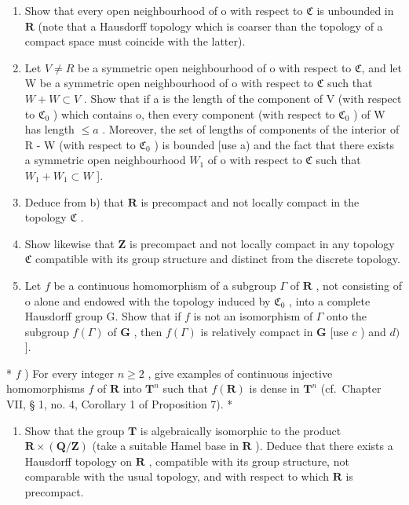 \begin{enumerate}
\def\labelenumi{\alph{enumi})}
\item
  Show that every open neighbourhood of o with respect to \(\mathfrak{C}\) is unbounded in \(\mathbf{R}\) (note that a Hausdorff topology which is coarser than the topology of a compact space must coincide with the latter).
\item
  Let \(V \neq R\) be a symmetric open neighbourhood of o with respect to \(\mathfrak{C}\), and let W be a symmetric open neighbourhood of o with respect to \(\mathfrak{C}\) such that \(W + W \subset V\) . Show that if a is the length of the component of V (with respect to \(\mathfrak{C}_{0}\) ) which contains o, then every component (with respect to \(\mathfrak{C}_{0}\) ) of W has length \(\leqslant a\) . Moreover, the set of lengths of components of the interior of R - W (with respect to \(\mathfrak{C}_{0}\) ) is bounded {[}use a) and the fact that there exists a symmetric open neighbourhood \(W_{1}\) of o with respect to \(\mathfrak{C}\) such that \(W_{1} + W_{1} \subset W\) {]}.
\item
  Deduce from b) that \(\mathbf{R}\) is precompact and not locally compact in the topology \(\mathfrak{C}\) .
\item
  Show likewise that \(\mathbf{Z}\) is precompact and not locally compact in any topology \(\mathfrak{C}\) compatible with its group structure and distinct from the discrete topology.
\item
  Let \(f\) be a continuous homomorphism of a subgroup \(\Gamma\) of \(\mathbf{R}\) , not consisting of o alone and endowed with the topology induced by \(\mathfrak{C}_0\) , into a complete Hausdorff group G. Show that if \(f\) is not an isomorphism of \(\Gamma\) onto the subgroup \(f(\Gamma)\) of \(\mathbf{G}\) , then \(f(\Gamma)\) is relatively compact in \(\mathbf{G}\) {[}use \(c\) ) and \(d)\) {]}.
\end{enumerate}

* \(f\) ) For every integer \(n \geqslant 2\) , give examples of continuous injective homomorphisms \(f\) of \(\mathbf{R}\) into \(\mathbf{T}^n\) such that \(f(\mathbf{R})\) is dense in \(\mathbf{T}^n\) (cf.~Chapter VII, § 1, no. 4, Corollary 1 of Proposition 7). *

\begin{enumerate}
\def\labelenumi{\arabic{enumi})}
\setcounter{enumi}{2}
\tightlist
\item
  Show that the group \(\mathbf{T}\) is algebraically isomorphic to the product \(\mathbf{R} \times (\mathbf{Q}/\mathbf{Z})\) (take a suitable Hamel base in \(\mathbf{R}\) ). Deduce that there exists a Hausdorff topology on \(\mathbf{R}\) , compatible with its group structure, not comparable with the usual topology, and with respect to which \(\mathbf{R}\) is precompact.
\end{enumerate}

